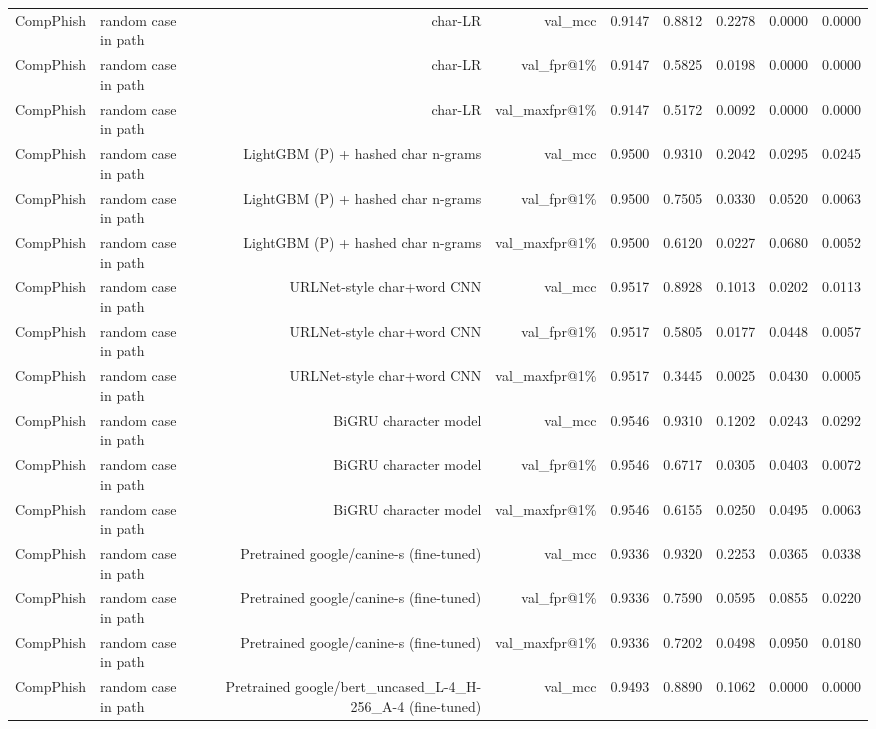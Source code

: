 \begin{table}[t]
\begin{tabular}{llrrrrrrr}
CompPhish & random case in path & char-LR & val\_mcc & 0.9147 & 0.8812 & 0.2278 & 0.0000 & 0.0000 \\
CompPhish & random case in path & char-LR & val\_fpr@1\% & 0.9147 & 0.5825 & 0.0198 & 0.0000 & 0.0000 \\
CompPhish & random case in path & char-LR & val\_maxfpr@1\% & 0.9147 & 0.5172 & 0.0092 & 0.0000 & 0.0000 \\
CompPhish & random case in path & LightGBM (P) + hashed char n-grams & val\_mcc & 0.9500 & 0.9310 & 0.2042 & 0.0295 & 0.0245 \\
CompPhish & random case in path & LightGBM (P) + hashed char n-grams & val\_fpr@1\% & 0.9500 & 0.7505 & 0.0330 & 0.0520 & 0.0063 \\
CompPhish & random case in path & LightGBM (P) + hashed char n-grams & val\_maxfpr@1\% & 0.9500 & 0.6120 & 0.0227 & 0.0680 & 0.0052 \\
CompPhish & random case in path & URLNet-style char+word CNN & val\_mcc & 0.9517 & 0.8928 & 0.1013 & 0.0202 & 0.0113 \\
CompPhish & random case in path & URLNet-style char+word CNN & val\_fpr@1\% & 0.9517 & 0.5805 & 0.0177 & 0.0448 & 0.0057 \\
CompPhish & random case in path & URLNet-style char+word CNN & val\_maxfpr@1\% & 0.9517 & 0.3445 & 0.0025 & 0.0430 & 0.0005 \\
CompPhish & random case in path & BiGRU character model & val\_mcc & 0.9546 & 0.9310 & 0.1202 & 0.0243 & 0.0292 \\
CompPhish & random case in path & BiGRU character model & val\_fpr@1\% & 0.9546 & 0.6717 & 0.0305 & 0.0403 & 0.0072 \\
CompPhish & random case in path & BiGRU character model & val\_maxfpr@1\% & 0.9546 & 0.6155 & 0.0250 & 0.0495 & 0.0063 \\
CompPhish & random case in path & Pretrained google/canine-s (fine-tuned) & val\_mcc & 0.9336 & 0.9320 & 0.2253 & 0.0365 & 0.0338 \\
CompPhish & random case in path & Pretrained google/canine-s (fine-tuned) & val\_fpr@1\% & 0.9336 & 0.7590 & 0.0595 & 0.0855 & 0.0220 \\
CompPhish & random case in path & Pretrained google/canine-s (fine-tuned) & val\_maxfpr@1\% & 0.9336 & 0.7202 & 0.0498 & 0.0950 & 0.0180 \\
CompPhish & random case in path & Pretrained google/bert\_uncased\_L-4\_H-256\_A-4 (fine-tuned) & val\_mcc & 0.9493 & 0.8890 & 0.1062 & 0.0000 & 0.0000 \\

\end{tabular}
\end{table}
